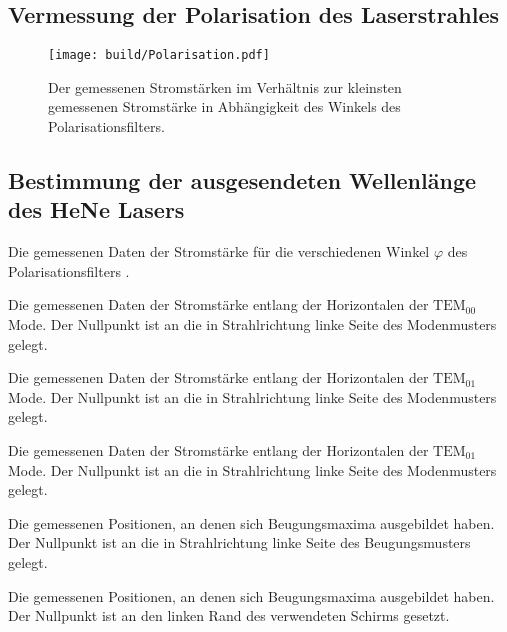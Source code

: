 \subsection{Vermessung der Polarisation des Laserstrahles}


\begin{figure}
	\centering
	\texttt{[image: build/Polarisation.pdf]}
	\caption{Der gemessenen Stromstärken im Verhältnis zur kleinsten gemessenen Stromstärke in Abhängigkeit des Winkels des Polarisationsfilters.}
	\label{fig:polarisation}
\end{figure}




\subsection{Bestimmung der ausgesendeten Wellenlänge des HeNe Lasers}




\begin{table}
	\centering
	\caption{Die gemessenen Daten der Stromstärke für die verschiedenen Winkel $\varphi$ des Polarisationsfilters .}
	
\end{table}
\begin{table}
	\centering
	\caption{Die gemessenen Daten der Stromstärke entlang der Horizontalen der $\text{TEM}_{\text{00}}$ Mode. Der Nullpunkt ist an die in Strahlrichtung linke Seite des Modenmusters gelegt.}
	
\end{table}
\begin{table}
	\centering
	\caption{Die gemessenen Daten der Stromstärke entlang der Horizontalen der $\text{TEM}_{\text{01}}$ Mode. Der Nullpunkt ist an die in Strahlrichtung linke Seite des Modenmusters gelegt.}
	
\end{table}
\begin{table}
	\centering
	\caption{Die gemessenen Daten der Stromstärke entlang der Horizontalen der $\text{TEM}_{\text{01}}$ Mode. Der Nullpunkt ist an die in Strahlrichtung linke Seite des Modenmusters gelegt.}
	
\end{table}
\begin{table}
	\centering
	\caption{Die gemessenen Positionen, an denen sich Beugungsmaxima ausgebildet haben. Der Nullpunkt ist an die in Strahlrichtung linke Seite des Beugungsmusters gelegt.}
	
\end{table}
\begin{table}
	\centering
	\caption{Die gemessenen Positionen, an denen sich Beugungsmaxima ausgebildet haben. Der Nullpunkt ist an den linken Rand des verwendeten Schirms gesetzt.}
	
\end{table}